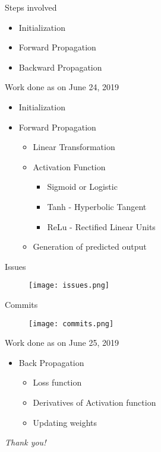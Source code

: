 \documentclass{beamer}
\begin{document}
\begin{frame}{Steps involved}
    \begin{itemize}
        \item Initialization
        \item Forward Propagation
        \item Backward Propagation
    \end{itemize}
\end{frame}
    
\begin{frame}{Work done as on June 24, 2019}
    \begin{itemize}
        \item Initialization
        \item Forward Propagation
        \pause
            \begin{itemize}
                \item Linear Transformation
                \pause
                \item Activation Function
                \pause
                    \begin{itemize}
                        \item Sigmoid or Logistic
                        \item Tanh - Hyperbolic Tangent
                        \item ReLu - Rectified Linear Units
                    \end{itemize}
                \pause
                \item Generation of predicted output
            \end{itemize}
    \end{itemize}
\end{frame}

\begin{frame}{Issues}
    \begin{figure}
        \centering
        \texttt{[image: issues.png]}
    \end{figure}
\end{frame}
    
\begin{frame}{Commits}
    \begin{figure}
        \centering
        \texttt{[image: commits.png]}
    \end{figure}
\end{frame}

\begin{frame}{Work done as on June 25, 2019}
    \begin{itemize}
        \item Back Propagation
        \pause
        \begin{itemize}
            \item Loss function
            \item Derivatives of Activation function
            \item Updating weights
         \end{itemize}
    \end{itemize}
\end{frame}
        
\begin{frame}{}
  \centering \Large
  \color{blue}
  \emph{Thank you!}
\end{frame}
\end{document}
